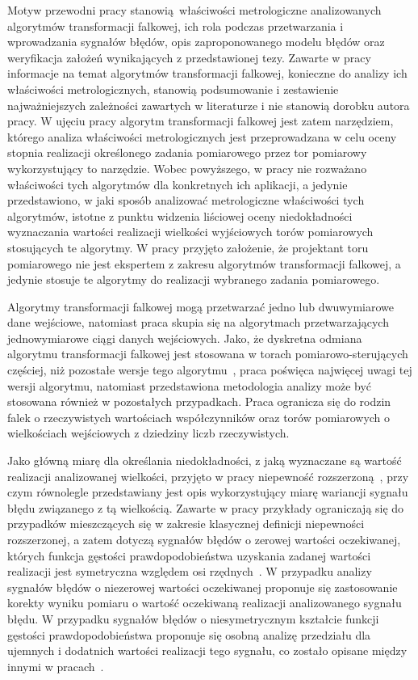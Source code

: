Motyw przewodni pracy stanowią właściwości metrologiczne analizowanych algorytmów transformacji falkowej, ich rola podczas przetwarzania i wprowadzania sygnałów błędów, opis zaproponowanego modelu błędów oraz weryfikacja założeń wynikających z przedstawionej tezy. Zawarte w pracy informacje na temat algorytmów transformacji falkowej, konieczne do analizy ich właściwości metrologicznych, stanowią podsumowanie i zestawienie najważniejszych zależności zawartych w literaturze i nie stanowią dorobku autora pracy. W ujęciu pracy algorytm transformacji falkowej jest zatem narzędziem, którego analiza właściwości metrologicznych jest przeprowadzana w celu oceny stopnia realizacji określonego zadania pomiarowego przez tor pomiarowy wykorzystujący to narzędzie. Wobec powyższego, w pracy nie rozważano właściwości tych algorytmów dla konkretnych ich aplikacji, a jedynie przedstawiono, w jaki sposób analizować metrologiczne właściwości tych algorytmów, istotne z punktu widzenia liściowej oceny niedokładności wyznaczania wartości realizacji wielkości wyjściowych torów pomiarowych stosujących te algorytmy. W pracy przyjęto założenie, że projektant toru pomiarowego nie jest ekspertem z zakresu algorytmów transformacji falkowej, a jedynie stosuje te algorytmy do realizacji wybranego zadania pomiarowego.

Algorytmy transformacji falkowej mogą przetwarzać jedno lub dwuwymiarowe dane wejściowe, natomiast praca skupia się na algorytmach przetwarzających jednowymiarowe ciągi danych wejściowych. Jako, że dyskretna odmiana algorytmu transformacji falkowej jest stosowana w torach pomiarowo-sterujących częściej, niż pozostałe wersje tego algorytmu~\cite{wallen_handbook, lord_guide, akujuobi_applications}, praca poświęca najwięcej uwagi tej wersji algorytmu, natomiast przedstawiona metodologia analizy może być stosowana również w pozostałych przypadkach. Praca ogranicza się do rodzin falek o rzeczywistych wartościach współczynników oraz torów pomiarowych o wielkościach wejściowych z dziedziny liczb rzeczywistych.

Jako główną miarę dla określania niedokładności, z jaką wyznaczane są wartość realizacji analizowanej wielkości, przyjęto w pracy niepewność rozszerzoną~\cite{jcgm_guide}, przy czym równolegle przedstawiany jest opis wykorzystujący miarę wariancji sygnału błędu związanego z tą wielkością. Zawarte w pracy przykłady ograniczają się do przypadków mieszczących się w zakresie klasycznej definicji niepewności rozszerzonej, a zatem dotyczą sygnałów błędów o zerowej wartości oczekiwanej, których funkcja gęstości prawdopodobieństwa uzyskania zadanej wartości realizacji jest symetryczna względem osi rzędnych~\cite{jcgm_guide}. W przypadku analizy sygnałów błędów o niezerowej wartości oczekiwanej proponuje się zastosowanie korekty wyniku pomiaru o wartość oczekiwaną realizacji analizowanego sygnału błędu. W przypadku sygnałów błędów o niesymetrycznym kształcie funkcji gęstości prawdopodobieństwa proponuje się osobną analizę przedziału dla ujemnych i dodatnich wartości realizacji tego sygnału, co zostało opisane między innymi w pracach~\cite{roj_annuncertainty, wymyslo_range, jakubiec_system}.

